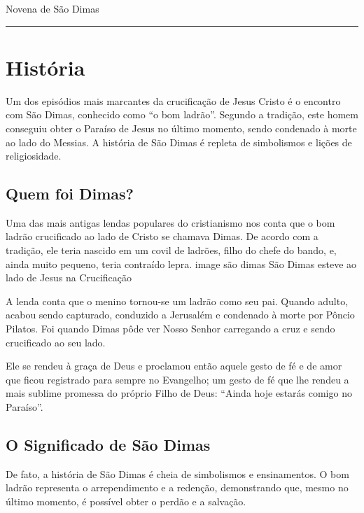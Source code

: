 \documentclass[a4paper,14pt]{extarticle} \usepackage[utf8]{inputenc}
\begin{document}


\begin{center}
	{\huge Novena de São Dimas}
\end{center}



\noindent\rule{\textwidth}{0.4pt}

\tableofcontents

\thispagestyle{empty}


\newpage

\section{História}

Um dos episódios mais marcantes da crucificação de Jesus Cristo é o encontro com São Dimas, conhecido como “o bom ladrão”. Segundo a tradição, este homem conseguiu obter o Paraíso de Jesus no último momento, sendo condenado à morte ao lado do Messias. A história de São Dimas é repleta de simbolismos e lições de religiosidade.
\subsection{Quem foi Dimas?}

Uma das mais antigas lendas populares do cristianismo nos conta que o bom ladrão crucificado ao lado de Cristo se chamava Dimas. De acordo com a tradição, ele teria nascido em um covil de ladrões, filho do chefe do bando, e, ainda muito pequeno, teria contraído lepra.
image são dimas São Dimas esteve ao lado de Jesus na Crucificação

A lenda conta que o menino tornou-se um ladrão como seu pai. Quando adulto, acabou sendo capturado, conduzido a Jerusalém e condenado à morte por Pôncio Pilatos. Foi quando Dimas pôde ver Nosso Senhor carregando a cruz e sendo crucificado ao seu lado.

Ele se rendeu à graça de Deus e proclamou então aquele gesto de fé e de amor que ficou registrado para sempre no Evangelho; um gesto de fé que lhe rendeu a mais sublime promessa do próprio Filho de Deus: “Ainda hoje estarás comigo no Paraíso”.
\subsection{O Significado de São Dimas}

De fato, a história de São Dimas é cheia de simbolismos e ensinamentos. O bom ladrão representa o arrependimento e a redenção, demonstrando que, mesmo no último momento, é possível obter o perdão e a salvação.
\end{document}
